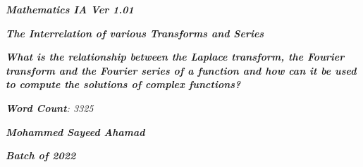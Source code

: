 

\begin{titlepage}
    \begin{center}
            
        \date{}
            
        \huge
            
        \textit{\textbf{Mathematics IA Ver 1.01}}
            
        \vspace{0.25cm}
            
        \hline
            
        \vspace{2.5cm}
            
        \textit{\textbf{The Interrelation of various Transforms and Series}}
            
        \vspace{1cm}
            
        \LARGE
            
        \textit{\textbf{What is the relationship between the Laplace transform, the Fourier transform and the Fourier series of a function and how can it be used to compute the solutions of complex functions? }}
            
        \vspace{2.5cm}

		\Large        
        
        \textit{\textbf{Word Count}: 3325}
        
		\vspace{1cm}        
            
        \Large
            
        \textit{\textbf{Mohammed Sayeed Ahamad}}
            
        \vspace{2cm}
            
        \Large
            
        \textit{\textbf{Batch of 2022}}
            
        \vspace{0.25cm}
            
        \hline
           
            
    \end{center}
\end{titlepage}



